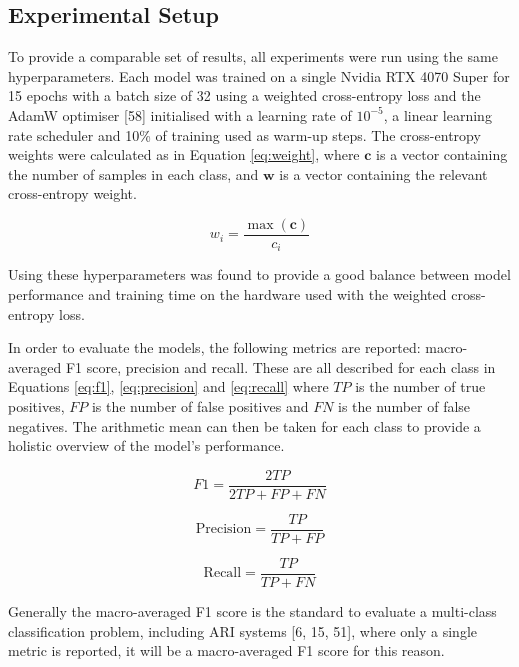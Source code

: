\documentclass[twocolumn]{article}
\begin{document}
\subsection{Experimental Setup}\label{sec:exp-setup}

To provide a comparable set of results, all experiments were run using
the same hyperparameters. Each model was trained on a single Nvidia RTX
4070 Super for 15 epochs with a batch size of 32 using a weighted
cross-entropy loss and the AdamW optimiser {[}58{]} initialised with a
learning rate of \(10^{-5}\), a linear learning rate scheduler and 10\%
of training used as warm-up steps. The cross-entropy weights were
calculated as in Equation \ref{eq:weight}, where \(\mathbf{c}\) is a
vector containing the number of samples in each class, and
\(\mathbf{w}\) is a vector containing the relevant cross-entropy weight.

\begin{equation} w_i = \frac{\max(\mathbf{c})}{c_i} \label{eq:weight}\end{equation}

Using these hyperparameters was found to provide a good balance between
model performance and training time on the hardware used with the
weighted cross-entropy loss.

In order to evaluate the models, the following metrics are reported:
macro-averaged F1 score, precision and recall. These are all described
for each class in Equations \ref{eq:f1}, \ref{eq:precision} and
\ref{eq:recall} where \(TP\) is the number of true positives, \(FP\) is
the number of false positives and \(FN\) is the number of false
negatives. The arithmetic mean can then be taken for each class to
provide a holistic overview of the model's performance.

\begin{equation} F1 = \frac{2TP}{2TP + FP + FN} \label{eq:f1}\end{equation}

\begin{equation} \text{Precision} = \frac{TP}{TP + FP} \label{eq:precision}\end{equation}

\begin{equation} \text{Recall} = \frac{TP}{TP + FN} \label{eq:recall}\end{equation}

Generally the macro-averaged F1 score is the standard to evaluate a
multi-class classification problem, including ARI systems {[}6,
15, 51{]}, where only a single metric is reported, it will be a
macro-averaged F1 score for this reason.
\end{document}

